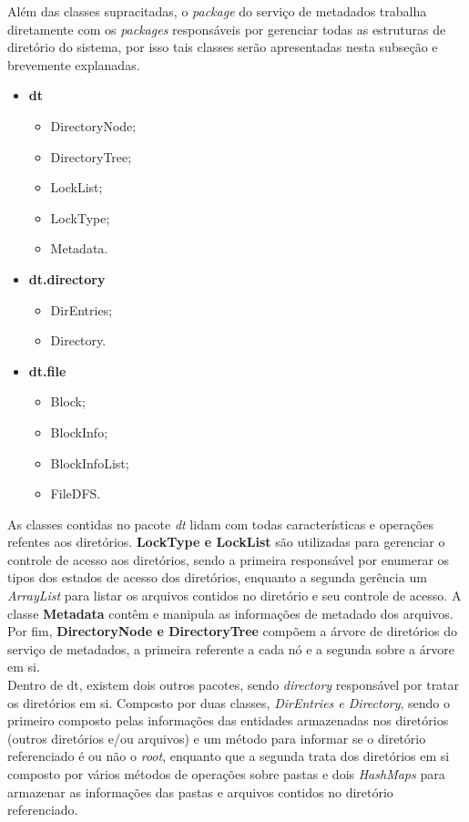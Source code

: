 Além das classes supracitadas, o \textit{package} do serviço de metadados trabalha diretamente com os \textit{packages} responsáveis por gerenciar todas as estruturas de diretório do sistema, por isso tais classes serão apresentadas nesta subseção e brevemente explanadas.
\\

\begin{itemize}
	\item \textbf{dt}
	\begin{itemize}
		\item DirectoryNode;
		\item DirectoryTree;
		\item LockList;
		\item LockType;
		\item Metadata.
	\end{itemize}
	\item \textbf{dt.directory}
	\begin{itemize}
		\item DirEntries;
		\item Directory.
	\end{itemize}
	\item \textbf{dt.file}
	\begin{itemize}
		\item Block;
		\item BlockInfo;
		\item BlockInfoList;
		\item FileDFS.
	\end{itemize}
\end{itemize}

As classes contidas no pacote \textit{dt} lidam com todas características e operações refentes aos diretórios. \textbf{LockType e LockList} são utilizadas para gerenciar o controle de acesso aos diretórios, sendo a primeira responsável por enumerar os tipos dos estados de acesso dos diretórios, enquanto a segunda gerência um \textit{ArrayList} para listar os arquivos contidos no diretório e seu controle de acesso. A classe \textbf{Metadata} contêm e manipula as informações de metadado dos arquivos. Por fim, \textbf{DirectoryNode e DirectoryTree} compõem a árvore de diretórios do serviço de metadados, a primeira referente a cada nó e a segunda sobre a árvore em si.
\\

Dentro de dt, existem dois outros pacotes, sendo \textit{directory} responsável por tratar os diretórios em si. Composto por duas classes, \textit{DirEntries e Directory}, sendo o primeiro composto pelas informações das entidades armazenadas nos diretórios (outros diretórios e/ou arquivos) e um método para informar se o diretório referenciado é ou não o \textit{root}, enquanto que a segunda trata dos diretórios em si composto por vários métodos de operações sobre pastas e dois \textit{HashMaps} para armazenar as informações das pastas e arquivos contidos no diretório referenciado.
\\

